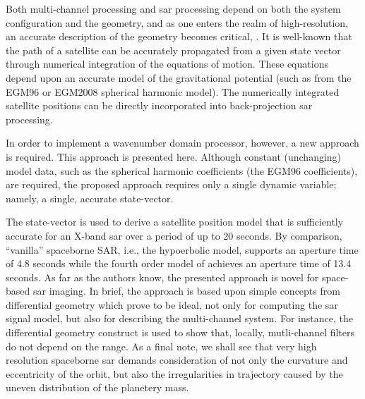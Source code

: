 \par
Both multi-channel processing and \gls{sar} processing depend on both the system configuration and the geometry, and as one enters the realm of high-resolution, an accurate description of the geometry becomes critical, \cite{Luo2014, Meng2018, Edelhust2017, Prats2014, Zhao2014, Wu2016}. It is well-known that the path of a satellite can be accurately propagated from a given state vector through numerical integration of the equations of motion. These equations depend upon an accurate model of the gravitational potential (such as from the EGM96 or EGM2008 spherical harmonic model). The numerically integrated satellite positions can be directly incorporated into back-projection \gls{sar} processing. 
\par 
In order to implement a wavenumber domain processor, however, a new approach is required. This approach is presented here. Although constant (unchanging) model data, such as the spherical harmonic coefficients (the EGM96 coefficients), are required, the proposed approach requires only a single dynamic variable; namely, a single, accurate state-vector. 
\par
The state-vector is used to derive a satellite position model that is sufficiently accurate for an X-band \gls{sar} over a period of up to 20 seconds. By comparison, ``vanilla'' spaceborne SAR, i.e., the hypoerbolic model, supports an aperture time of 4.8 seconds while the fourth order model of \cite{Luo2014} achieves an aperture time of 13.4 seconds. As far as the authors know, the presented approach is novel for space-based \gls{sar} imaging. In brief, the approach is based upon simple concepts from differential geometry which prove to be ideal, not only for computing the \gls{sar} signal model, but also for describing the multi-channel system. For instance, the differential geometry construct is used to show that, locally, mutli-channel filters do not depend on the range. As a final note, we shall see that very high resolution spaceborne \gls{sar} demands consideration of not only the curvature and eccentricity of the orbit, but also the irregularities in trajectory caused by the uneven distribution of the planetery mass.
